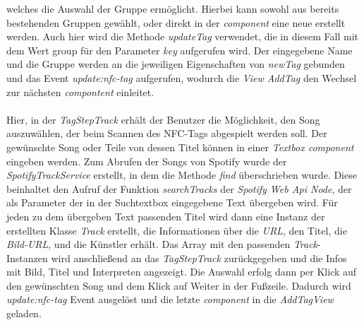 \documentclass[10pt, a4paper]{article}
\begin{document}
welches die Auswahl der Gruppe ermöglicht. Hierbei kann sowohl aus bereits bestehenden Gruppen gewählt, oder direkt in der \textit{component} eine neue erstellt
werden. Auch hier wird die Methode \textit{updateTag} verwendet, die in diesem Fall mit dem Wert \glqq group \grqq{} für den Parameter \textit{key} aufgerufen wird. Der eingegebene Name und die Gruppe werden an die jeweiligen Eigenschaften von \textit{newTag} gebunden und das Event \textit{update:nfc-tag} aufgerufen, wodurch die \textit{View AddTag} den Wechsel zur nächsten \textit{compontent} einleitet.
\\~\\
Hier, in der \textit{TagStepTrack} erhält der Benutzer die Möglichkeit, den Song auszuwählen, der beim Scannen des NFC-Tags abgespielt werden soll. Der gewünschte Song oder Teile von dessen Titel können in einer \textit{Textbox component} eingeben werden. Zum Abrufen der Songs von Spotify wurde der \textit{SpotifyTrackService} erstellt, in dem die Methode \textit{find} überschrieben wurde. Diese beinhaltet den Aufruf der Funktion \textit{searchTracks} der \textit{Spotify Web Api Node}, der als Parameter der in der Suchtextbox eingegebene Text übergeben wird. Für jeden zu dem übergeben Text passenden Titel wird dann eine Instanz der erstellten Klasse \textit{Track} erstellt, die Informationen über die \textit{URL}, den Titel, die \textit{Bild-URL}, und die Künstler erhält. Das Array mit den passenden \textit{Track}-Instanzen wird anschließend an das \textit{TagStepTrack} zurückgegeben und die Infos mit Bild, Titel und Interpreten angezeigt. Die Auswahl erfolg dann per Klick auf den gewünschten Song und dem Klick auf Weiter in der Fußzeile. Dadurch wird \textit{update:nfc-tag} Event ausgelöst und die letzte \textit{component} in die \textit{AddTagView} geladen.
\end{document}

